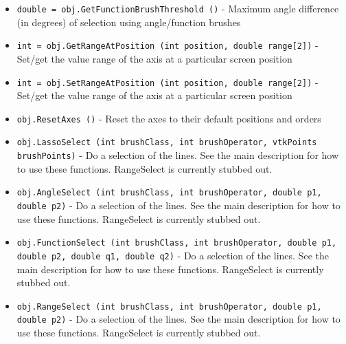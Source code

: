 \begin{itemize}
\item  \verb|double = obj.GetFunctionBrushThreshold ()| -  Maximum angle difference (in degrees) of selection using angle/function brushes

\item  \verb|int = obj.GetRangeAtPosition (int position, double range[2])| -  Set/get the value range of the axis at a particular screen position

\item  \verb|int = obj.SetRangeAtPosition (int position, double range[2])| -  Set/get the value range of the axis at a particular screen position

\item  \verb|obj.ResetAxes ()| -  Reset the axes to their default positions and orders

\item  \verb|obj.LassoSelect (int brushClass, int brushOperator, vtkPoints brushPoints)| -  Do a selection of the lines.  See the main description for how to use these functions.  
 RangeSelect is currently stubbed out.

\item  \verb|obj.AngleSelect (int brushClass, int brushOperator, double p1, double p2)| -  Do a selection of the lines.  See the main description for how to use these functions.  
 RangeSelect is currently stubbed out.

\item  \verb|obj.FunctionSelect (int brushClass, int brushOperator, double p1, double p2, double q1, double q2)| -  Do a selection of the lines.  See the main description for how to use these functions.  
 RangeSelect is currently stubbed out.

\item  \verb|obj.RangeSelect (int brushClass, int brushOperator, double p1, double p2)| -  Do a selection of the lines.  See the main description for how to use these functions.  
 RangeSelect is currently stubbed out.

\end{itemize}
